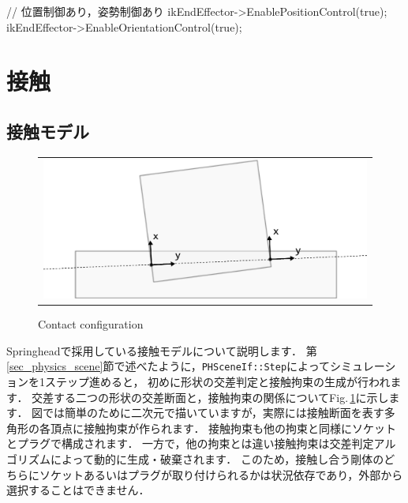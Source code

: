 \begin{sourcecode}
// 位置制御あり，姿勢制御あり
ikEndEffector->EnablePositionControl(true);
ikEndEffector->EnableOrientationControl(true);
\end{sourcecode}


\KLUDGE %
\KLUDGE %

\section{接触}
\label{sec_physics_contact}


\subsection*{接触モデル}

\begin{figure}[t]
\begin{center}
\begin{tabular}{c}
\includegraphics[clip, width=.7\hsize]{fig/phcontact.eps} \\
\end{tabular}
\end{center}
\caption{Contact configuration}
\label{fig_physics_contact}
\end{figure}

Springheadで採用している接触モデルについて説明します．
\KLUDGE 第\ref{sec_physics_scene}節で述べたように，\texttt{PHSceneIf::Step}によってシミュレーションを1ステップ進めると，
\KLUDGE 初めに形状の交差判定と接触拘束の生成が行われます．
\KLUDGE 交差する二つの形状の交差断面と，接触拘束の関係についてFig.\,\ref{fig_physics_contact}に示します．
\KLUDGE 図では簡単のために二次元で描いていますが，実際には接触断面を表す多角形の各頂点に接触拘束が作られます．
\KLUDGE 接触拘束も他の拘束と同様にソケットとプラグで構成されます．
\KLUDGE 一方で，他の拘束とは違い接触拘束は交差判定アルゴリズムによって動的に生成・破棄されます．
\KLUDGE このため，接触し合う剛体のどちらにソケットあるいはプラグが取り付けられるかは状況依存であり，外部から選択することはできません．

